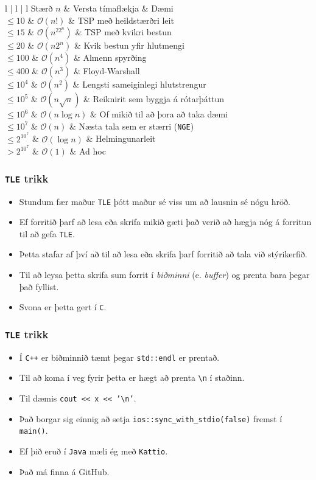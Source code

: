 \documentclass[handout]{beamer}
\newcommand\env[2]
{
	\begin{#1}
	#2
	\end{#1}
}
\begin{document}
\env{frame}
{
	\env{tabular}
	{
		{l | l | l}
		Stærð $n$ & Versta tímaflækja & Dæmi\\
		\hline
		$\leq 10$ & $\mathcal{O}(n!)$ & TSP með heildstærðri leit\\
		$\leq 15$ & $\mathcal{O}(n^22^n)$ & TSP með kvikri bestun\\
		$\leq 20$ & $\mathcal{O}(n2^n)$ & Kvik bestun yfir hlutmengi\\
		$\leq 100$ & $\mathcal{O}(n^4)$ & Almenn spyrðing\\
		$\leq 400$ & $\mathcal{O}(n^3)$ & Floyd-Warshall\\
		$\leq 10^4$ & $\mathcal{O}(n^2)$ & Lengsti sameiginlegi hlutstrengur\\
		$\leq 10^5$ & $\mathcal{O}(n \sqrt{n})$ & Reiknirit sem byggja á rótarþáttun\\
		$\leq 10^6$ & $\mathcal{O}(n \log n)$ & Of mikið til að þora að taka dæmi\\
		$\leq 10^7$ & $\mathcal{O}(n)$ & Næsta tala sem er stærri (\texttt{NGE})\\
		$\leq 2^{10^7}$ & $\mathcal{O}(\log n)$ & Helmingunarleit\\
		$> 2^{10^7}$ & $\mathcal{O}(1)$ & Ad hoc
	}
}

\env{frame}
{
	\frametitle{\texttt{TLE} trikk}
	\env{itemize}
	{
		\item<1-> Stundum fær maður \texttt{TLE} þótt maður sé viss um að lausnin sé nógu hröð.
		\item<2-> Ef forritið þarf að lesa eða skrifa mikið gæti það verið að hægja nóg á forritun til að gefa \texttt{TLE}.
		\item<3-> Þetta stafar af því að til að lesa eða skrifa þarf forritið að tala við stýrikerfið.
		\item<4-> Til að leysa þetta skrifa sum forrit í \emph{biðminni} (e. \emph{buffer}) og prenta bara þegar það fyllist.
		\item<5-> Svona er þetta gert í \texttt{C}.
	}
}

\env{frame}
{
	\frametitle{\texttt{TLE} trikk}
	\env{itemize}
	{
		\item<1-> Í \texttt{C++} er biðminnið tæmt þegar \texttt{std::endl} er prentað.
		\item<2-> Til að koma í veg fyrir þetta er hægt að prenta \texttt{\textbackslash n} í staðinn.
		\item<3-> Til dæmis \texttt{cout << x << '\textbackslash n'}.
		\item<4-> Það borgar sig einnig að setja \texttt{ios::sync\_with\_stdio(false)} fremst í \texttt{main()}.
		\item<5-> Ef þið eruð í \texttt{Java} mæli ég með \texttt{Kattio}.
		\item<6-> Það má finna á GitHub.
	}
}
\end{document}
